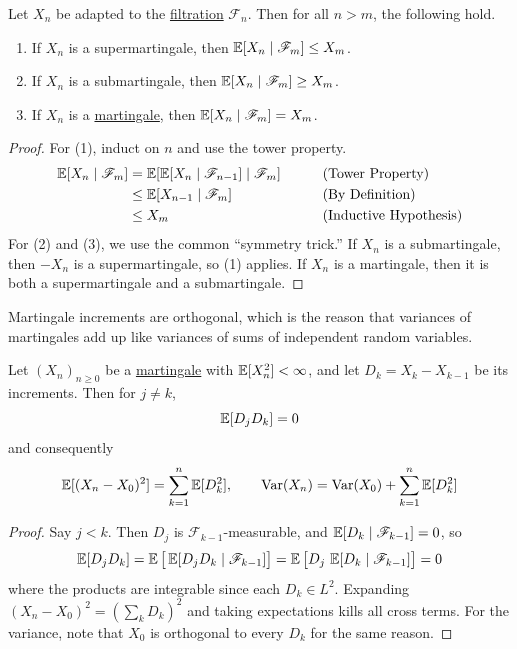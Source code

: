 	\begin{lemma}
	  \label{lem:multi-step-conditional-expectations}
		Let $X_n$ be adapted to the \hyperref[def:filtration]{filtration} $\mathscr{F}_n$. Then for all $n > m$, the following hold. 
		\begin{enumerate}
			\item If $X_n$ is a supermartingale, then $\operatorname{\mathbb{E}}[X_n \mid \mathscr{F}_m] \leq X_m$. 
			\item If $X_n$ is a submartingale, then $\operatorname{\mathbb{E}}[X_n \mid \mathscr{F}_m] \geq X_m$. 
			\item If $X_n$ is a \hyperref[def:martingale]{martingale}, then $\operatorname{\mathbb{E}}[X_n \mid \mathscr{F}_m] = X_m$. 
		\end{enumerate}
	\end{lemma}
	\begin{proof}
	  For (1), induct on $n$ and use the tower property. 
		\begin{align}
			\operatorname{\mathbb{E}}[X_n \mid \mathscr{F}_m] & = \operatorname{\mathbb{E}}[\operatorname{\mathbb{E}}[X_n \mid \mathscr{F}_{n-1}] \mid \mathscr{F}_m ] && \tag{Tower Property} \\ 
																				 & \leq \operatorname{\mathbb{E}}[X_{n-1} \mid \mathscr{F}_m ] && \tag{By Definition} \\ 
																				 & \leq X_m && \tag{Inductive Hypothesis}
		\end{align}
		For (2) and (3), we use the common ``symmetry trick.'' If $X_n$ is a submartingale, then $-X_n$ is a supermartingale, so (1) applies. If $X_n$ is a martingale, then it is both a supermartingale and a submartingale. 
	\end{proof}

	Martingale increments are orthogonal, which is the reason that variances of martingales add up like variances of sums of independent random variables. 

	\begin{lemma}
	  \label{lem:orthogonality-of-martingale-increments}
		Let $(X_n)_{n \geq 0}$ be a \hyperref[def:martingale]{martingale} with $\operatorname{\mathbb{E}}[X_n^2] < \infty$, and let $D_k = X_k - X_{k-1}$ be its increments. Then for $j \neq k$, 
		\begin{equation}
			\operatorname{\mathbb{E}}[D_j D_k] = 0
		\end{equation}
		and consequently 
		\begin{equation}
			\operatorname{\mathbb{E}}[(X_n - X_0)^2] = \sum_{k=1}^n \operatorname{\mathbb{E}}[D_k^2], \qquad \operatorname{Var}(X_n) = \operatorname{Var}(X_0) + \sum_{k=1}^n \operatorname{\mathbb{E}}[D_k^2]
		\end{equation}
	\end{lemma}
	\begin{proof}
	  Say $j < k$. Then $D_j$ is $\mathscr{F}_{k-1}$-measurable, and $\operatorname{\mathbb{E}}[D_k \mid \mathscr{F}_{k-1}] = 0$, so 
		\begin{equation}
			\operatorname{\mathbb{E}}[D_j D_k] = \operatorname{\mathbb{E}}\big[ \operatorname{\mathbb{E}}[D_j D_k \mid \mathscr{F}_{k-1}] \big] = \operatorname{\mathbb{E}}\big[ D_j \, \operatorname{\mathbb{E}}[D_k \mid \mathscr{F}_{k-1}] \big] = 0
		\end{equation}
		where the products are integrable since each $D_k \in L^2$. Expanding $(X_n - X_0)^2 = (\sum_k D_k)^2$ and taking expectations kills all cross terms. For the variance, note that $X_0$ is orthogonal to every $D_k$ for the same reason. 
	\end{proof}

